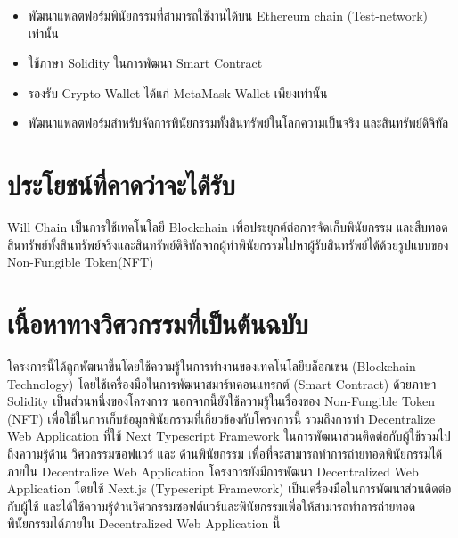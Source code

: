 \documentclass[12pt,oneside,openright,a4paper]{cpe-thai-project}
\begin{document}
\begin{itemize}
\item พัฒนาแพลตฟอร์มพินัยกรรมที่สามารถใช้งานได้บน Ethereum chain (Test-network) เท่านั้น
\item ใช้ภาษา Solidity ในการพัฒนา Smart Contract
\item รองรับ Crypto Wallet ได้แก่ MetaMask Wallet เพียงเท่านั้น
\item พัฒนาแพลตฟอร์มสำหรับจัดการพินัยกรรมทั้งสินทรัพย์ในโลกความเป็นจริง และสินทรัพย์ดิจิทัล
\end{itemize}

\section{ประโยชน์ที่คาดว่าจะได้่รับ}
\tab Will Chain เป็นการใช้เทคโนโลยี Blockchain เพื่อประยุกต์ต่อการจัดเก็บพินัยกรรม และสืบทอดสินทรัพย์ทั้งสินทรัพย์จริงและสินทรัพย์ดิจิทัลจากผู้ทำพินัยกรรมไปหาผู้รับสินทรัพย์ได้ด้วยรูปแบบของ Non-Fungible Token(NFT)
\section{เนื้อหาทางวิศวกรรมที่เป็นต้นฉบับ}
\tab โครงการนี้ได้ถูกพัฒนาขึ้นโดยใช้ความรู้ในการทำงานของเทคโนโลยีบล็อกเชน (Blockchain Technology) โดยใช้เครื่องมือในการพัฒนาสมาร์ทคอนแทรกต์ (Smart Contract) ด้วยภาษา Solidity เป็นส่วนหนึ่งของโครงการ นอกจากนี้ยังใช้ความรู้ในเรื่องของ Non-Fungible Token (NFT) เพื่อใช้ในการเก็บข้อมูลพินัยกรรมที่เกี่ยวข้องกับโครงการนี้ รวมถึงการทำ Decentralize  Web Application ที่ใช้ Next Typescript Framework ในการพัฒนาส่วนติดต่อกับผู้ใช้รวมไปถึงความรู้ด้าน วิศวกรรมซอฟแวร์ และ ด้านพินัยกรรม เพื่อที่จะสามารถทำการถ่ายทอดพินัยกรรมได้ภายใน Decentralize  Web Application
\tab โครงการยังมีการพัฒนา Decentralized Web Application โดยใช้ Next.js (Typescript Framework) เป็นเครื่องมือในการพัฒนาส่วนติดต่อกับผู้ใช้ และได้ใช้ความรู้ด้านวิศวกรรมซอฟต์แวร์และพินัยกรรมเพื่อให้สามารถทำการถ่ายทอดพินัยกรรมได้ภายใน Decentralized Web Application นี้
\clearpage
\end{document}
